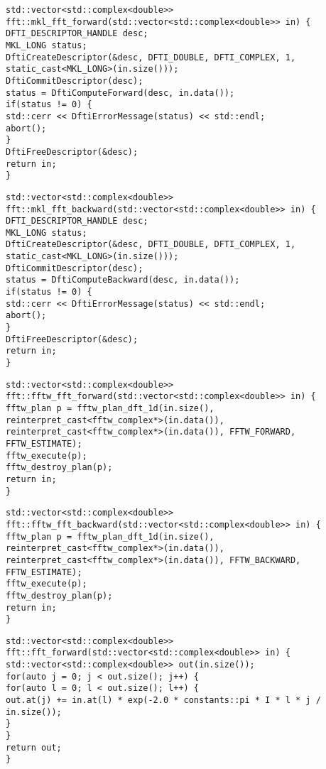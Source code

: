 \begin{lstlisting}[style=CXX, caption=Function performing forward fast Fourier transform using MKL library]
std::vector<std::complex<double>> fft::mkl_fft_forward(std::vector<std::complex<double>> in) {
DFTI_DESCRIPTOR_HANDLE desc;
MKL_LONG status;
DftiCreateDescriptor(&desc, DFTI_DOUBLE, DFTI_COMPLEX, 1, static_cast<MKL_LONG>(in.size()));
DftiCommitDescriptor(desc);
status = DftiComputeForward(desc, in.data());
if(status != 0) {
std::cerr << DftiErrorMessage(status) << std::endl;
abort();
}
DftiFreeDescriptor(&desc);
return in;
}
\end{lstlisting}

\begin{lstlisting}[style=CXX, caption=Function performing backward fast Fourier transform using MKL library]
std::vector<std::complex<double>> fft::mkl_fft_backward(std::vector<std::complex<double>> in) {
DFTI_DESCRIPTOR_HANDLE desc;
MKL_LONG status;
DftiCreateDescriptor(&desc, DFTI_DOUBLE, DFTI_COMPLEX, 1, static_cast<MKL_LONG>(in.size()));
DftiCommitDescriptor(desc);
status = DftiComputeBackward(desc, in.data());
if(status != 0) {
std::cerr << DftiErrorMessage(status) << std::endl;
abort();
}
DftiFreeDescriptor(&desc);
return in;
}
\end{lstlisting}

\begin{lstlisting}[style=CXX, caption=Function performing forward fast Fourier transform using FFTW library]
std::vector<std::complex<double>> fft::fftw_fft_forward(std::vector<std::complex<double>> in) {
fftw_plan p = fftw_plan_dft_1d(in.size(), reinterpret_cast<fftw_complex*>(in.data()), reinterpret_cast<fftw_complex*>(in.data()), FFTW_FORWARD, FFTW_ESTIMATE);
fftw_execute(p);
fftw_destroy_plan(p);
return in;
}
\end{lstlisting}

\begin{lstlisting}[style=CXX, caption=Function performing backward fast Fourier transform using FFTW library]
std::vector<std::complex<double>> fft::fftw_fft_backward(std::vector<std::complex<double>> in) {
fftw_plan p = fftw_plan_dft_1d(in.size(), reinterpret_cast<fftw_complex*>(in.data()), reinterpret_cast<fftw_complex*>(in.data()), FFTW_BACKWARD, FFTW_ESTIMATE);
fftw_execute(p);
fftw_destroy_plan(p);
return in;
}
\end{lstlisting}

\begin{lstlisting}[style=CXX, caption=Function performing forward discrete Fourier transform without using any library]
std::vector<std::complex<double>> fft::fft_forward(std::vector<std::complex<double>> in) {
std::vector<std::complex<double>> out(in.size());
for(auto j = 0; j < out.size(); j++) {
for(auto l = 0; l < out.size(); l++) {
out.at(j) += in.at(l) * exp(-2.0 * constants::pi * I * l * j / in.size());
}
}
return out;
}
\end{lstlisting}

